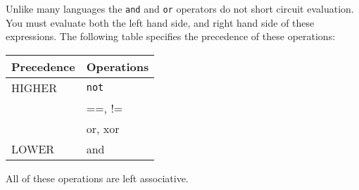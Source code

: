 \documentclass[../gazprea.tex]{subfiles}
\begin{document}
	Unlike many languages the \texttt{and} and \texttt{or} operators do not short circuit evaluation. You must
	evaluate both the left hand side, and right hand side of these expressions. The following table specifies the
	precedence of these operations:

	\begin{center}
		\begin{tabular}{|l|l|}
			\hline
			\textbf{Precedence} & \textbf{Operations} \\
			\hline
			HIGHER & \texttt{not} \\
			       & ==, !=       \\
			       & or, xor      \\
			LOWER  & and          \\
			\hline
		\end{tabular}
	\end{center}

	All of these operations are left associative.
\end{document}
